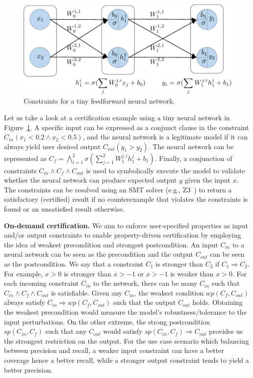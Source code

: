 \begin{figure}
    \includegraphics[width=\linewidth]{fig/RP_TASK3_neuralStructure.pdf}
     \caption{\footnotesize Constraints for a tiny  feedforward neural network.}
    \label{fig:neuralStructure}
\end{figure}

Let us take a look at a certification example using a tiny neural network in Figure~\ref{fig:neuralStructure}. 
A specific input can be expressed as a conjunct clause in the constraint $C_{in}(x_1 < 0.2 \wedge x_2 < 0.5)$, and the neural network is a legitimate model if it can always yield user desired output $C_{out}(y_1 > y_2)$. 
The neural network can be represented as $C_{f}= \bigwedge\limits_{i=1}^2{\sigma(\sum_{j=1}^2W_1^{j,i}h_1^j+b_1)}$.
Finally, a conjunction of constraints $C_{in} \wedge C_{f} \wedge C_{out}$ is used to symbolically execute the model to validate whether the neural network can produce expected output $y$ given the input $x$. 
The constraints can be resolved using an SMT solver (e.g., Z3~\cite{moura2008z3}) to return a satisfactory (certified) result if no counterexample that violates the constraints is found or an unsatisfied result otherwise. 


\textbf{On-demand certification.} We aim to enforce user-specified properties as input and/or output constraints to enable property-driven certification by employing the idea of weakest precondition and strongest postcondition. 
An input $C_{in}$ to a neural network can be seen as the  precondition and the output $C_{out}$ can be seen as the postcondition.
We say that a constraint $C_{1}$ is stronger than $C_{2}$ if $C_{1}\Rightarrow C_{2}$. 
For example, $x > 0$ is stronger than $x > -1$ or $x > -1$ is weaker than $x > 0$. 
For each incoming constraint $C_{in}$ to the network, there can be many $C_{in}$ such that $C_{in}\wedge C_{f} \wedge C_{out}$ is satisfiable. 
Given any $C_{in}$, the weakest condition $wp(C_{f}, C_{out})$ always satisfy $C_{in} \Rightarrow wp(C_{f}, C_{out})$ such that the output $C_{out}$ holds. 
Obtaining the weakest precondition would measure the model's robustness/tolerance to the input perturbations. On the other  extreme, the strong postcondition $sp(C_{in}, C_{f})$ such that any $C_{out}$ would satisfy $sp(C_{in}, C_{f}) \Rightarrow C_{out}$ provides us the strongest restriction on the output. 
For the use case scenario which balancing between precision and recall, a weaker input constraint can have a better coverage hence a better recall, while a stronger output constraint tends to yield a better precision. 

